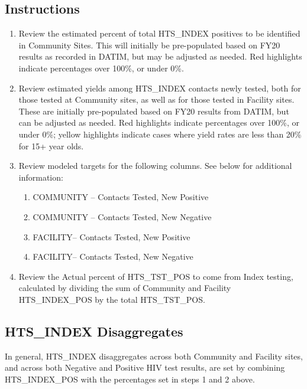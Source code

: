 \documentclass[
  openany]{book}
\begin{document}
\hypertarget{instructions-25}{%
\subsection{Instructions}\label{instructions-25}}

\begin{enumerate}
\def\labelenumi{\arabic{enumi}.}
\item
  Review the estimated percent of total HTS\_INDEX positives to be
  identified in Community Sites. This will initially be pre-populated
  based on FY20 results as recorded in DATIM, but may be adjusted as
  needed. Red highlights indicate percentages over 100\%, or under 0\%.
\item
  Review estimated yields among HTS\_INDEX contacts newly tested, both
  for those tested at Community sites, as well as for those tested in
  Facility sites. These are initially pre-populated based on FY20
  results from DATIM, but can be adjusted as needed. Red highlights
  indicate percentages over 100\%, or under 0\%; yellow highlights
  indicate cases where yield rates are less than 20\% for 15+ year
  olds.
\item
  Review modeled targets for the following columns. See below for
  additional information:

  \begin{enumerate}
  \def\labelenumii{\alph{enumii}.}
  \item
    COMMUNITY -- Contacts Tested, New Positive
  \item
    COMMUNITY -- Contacts Tested, New Negative
  \item
    FACILITY-- Contacts Tested, New Positive
  \item
    FACILITY-- Contacts Tested, New Negative
  \end{enumerate}
\item
  Review the Actual percent of HTS\_TST\_POS to come from Index testing,
  calculated by dividing the sum of Community and Facility
  HTS\_INDEX\_POS by the total HTS\_TST\_POS.
\end{enumerate}

\hypertarget{hts_index-disaggregates}{%
\subsection{HTS\_INDEX Disaggregates}\label{hts_index-disaggregates}}

In general, HTS\_INDEX disaggregates across both Community and Facility
sites, and across both Negative and Positive HIV test results, are set
by combining HTS\_INDEX\_POS with the percentages set in steps 1 and 2
above.
\end{document}
